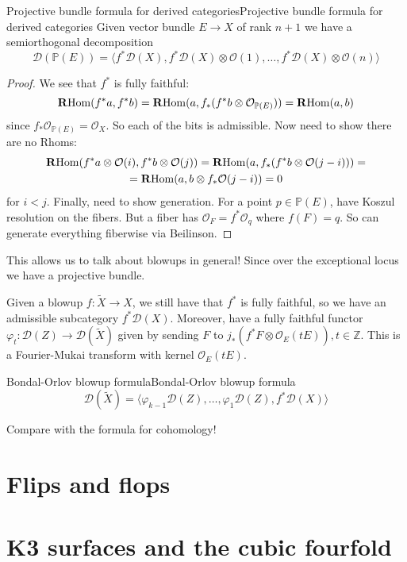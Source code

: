 \begin{proposition}{Projective bundle formula for derived categories}{Projective bundle formula for derived categories}
    Given vector bundle $E\rightarrow X$ of rank $n+1$ we have a semiorthogonal decomposition $$\mathcal{D}(\mathbb{P}(E))=\langle f^*\mathcal{D}(X), f^*\mathcal{D}(X)\otimes \mathcal{O}(1),\dots, f^*\mathcal{D}(X)\otimes \mathcal{O}(n)\rangle$$
\end{proposition}

\begin{proof}
    We see that $f^*$ is fully faithful: $$\operatorname{\mathbf{R}Hom}(f^*a,f^*b)=\operatorname{\mathbf{R}Hom}(a, f_{*} (f^*b\otimes \mathcal{O}_{\mathbb{P}(E)}))=\operatorname{\mathbf{R}Hom}(a, b)$$since $f_*\mathcal{O}_{\mathbb{P}(E)}=\mathcal{O}_{X}$. So each of the bits is admissible. Now need to show there are no Rhoms: $$\begin{gathered}
\operatorname{\mathbf{R}Hom}(f^*a\otimes \mathcal{O}(i), f^*b\otimes \mathcal{O}(j))=\operatorname{\mathbf{R}Hom}(a, f_{*}(f^*b\otimes \mathcal{O}(j-i)))=\\
=\operatorname{\mathbf{R}Hom}(a, b\otimes f_{*}\mathcal{O}(j-i))=0
\end{gathered}$$for $i<j$. Finally, need to show generation. For a point $p\in \mathbb{P}(E)$, have Koszul resolution on the fibers. But a fiber has $\mathcal{O}_{F}=f^*\mathcal{O}_{q}$ where $f(F)=q$. So can generate everything fiberwise via Beilinson.  
\end{proof}

This allows us to talk about blowups in general! Since over the exceptional locus we have a projective bundle. 

Given a blowup $f:\tilde{X}\xrightarrow{}X$, we still have that $f^*$ is fully faithful, so we have an admissible subcategory $f^*\mathcal{D}(X)$. Moreover, have a fully faithful functor $\varphi_{t}:\mathcal{D}(Z)\xrightarrow{}\mathcal{D}(\tilde{X})$ given by sending $F$ to $j_{*}(f^*F\otimes \mathcal{O}_{E}(tE)), t\in \mathbb{Z}$. This is a Fourier-Mukai transform with kernel $\mathcal{O}_{E}(tE)$.


\begin{theorem}{Bondal-Orlov blowup formula}{Bondal-Orlov blowup formula}
    $$\mathcal{D}(\tilde{X})=\langle \varphi_{{k-1}}\mathcal{D}(Z),\dots,\varphi_{1}\mathcal{D}(Z), f^*\mathcal{D}(X)\rangle$$
\end{theorem}

Compare with the formula for cohomology!


\section{Flips and flops}


\section{K3 surfaces and the cubic fourfold}

